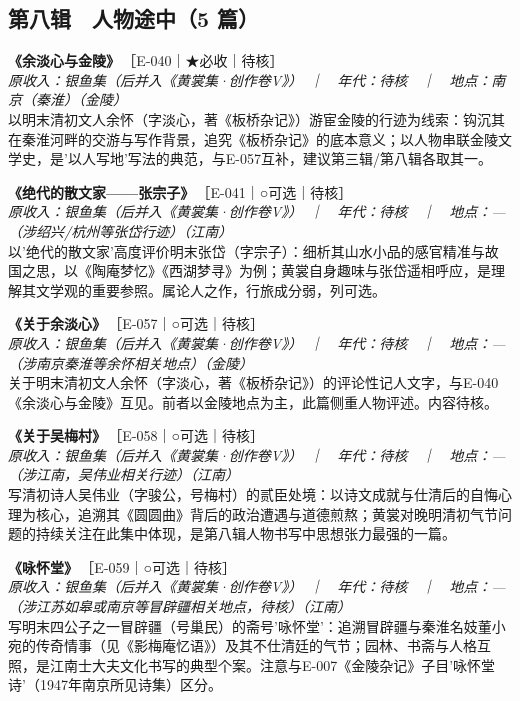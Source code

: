 \documentclass[UTF8,fontset=none,zihao=-4,a4paper]{ctexart}
\begin{document}
\subsection{第八辑　人物途中（5 篇）}
\noindent\textbf{《余淡心与金陵》}\,{\small ［E-040｜★必收｜待核］}\\
{\small\itshape 原收入：银鱼集（后并入《黄裳集·创作卷V》）　｜　年代：待核　｜　地点：南京（秦淮）（金陵）}\\
以明末清初文人余怀（字淡心，著《板桥杂记》）游宦金陵的行迹为线索：钩沉其在秦淮河畔的交游与写作背景，追究《板桥杂记》的底本意义；以人物串联金陵文学史，是'以人写地'写法的典范，与E-057互补，建议第三辑/第八辑各取其一。
\par\vspace{5pt}
\noindent\textbf{《绝代的散文家——张宗子》}\,{\small ［E-041｜○可选｜待核］}\\
{\small\itshape 原收入：银鱼集（后并入《黄裳集·创作卷V》）　｜　年代：待核　｜　地点：—（涉绍兴/杭州等张岱行迹）（江南）}\\
以'绝代的散文家'高度评价明末张岱（字宗子）：细析其山水小品的感官精准与故国之思，以《陶庵梦忆》《西湖梦寻》为例；黄裳自身趣味与张岱遥相呼应，是理解其文学观的重要参照。属论人之作，行旅成分弱，列可选。
\par\vspace{5pt}
\noindent\textbf{《关于余淡心》}\,{\small ［E-057｜○可选｜待核］}\\
{\small\itshape 原收入：银鱼集（后并入《黄裳集·创作卷V》）　｜　年代：待核　｜　地点：—（涉南京秦淮等余怀相关地点）（金陵）}\\
关于明末清初文人余怀（字淡心，著《板桥杂记》）的评论性记人文字，与E-040《余淡心与金陵》互见。前者以金陵地点为主，此篇侧重人物评述。内容待核。
\par\vspace{5pt}
\noindent\textbf{《关于吴梅村》}\,{\small ［E-058｜○可选｜待核］}\\
{\small\itshape 原收入：银鱼集（后并入《黄裳集·创作卷V》）　｜　年代：待核　｜　地点：—（涉江南，吴伟业相关行迹）（江南）}\\
写清初诗人吴伟业（字骏公，号梅村）的贰臣处境：以诗文成就与仕清后的自悔心理为核心，追溯其《圆圆曲》背后的政治遭遇与道德煎熬；黄裳对晚明清初气节问题的持续关注在此集中体现，是第八辑人物书写中思想张力最强的一篇。
\par\vspace{5pt}
\noindent\textbf{《咏怀堂》}\,{\small ［E-059｜○可选｜待核］}\\
{\small\itshape 原收入：银鱼集（后并入《黄裳集·创作卷V》）　｜　年代：待核　｜　地点：—（涉江苏如皋或南京等冒辟疆相关地点，待核）（江南）}\\
写明末四公子之一冒辟疆（号巢民）的斋号'咏怀堂'：追溯冒辟疆与秦淮名妓董小宛的传奇情事（见《影梅庵忆语》）及其不仕清廷的气节；园林、书斋与人格互照，是江南士大夫文化书写的典型个案。注意与E-007《金陵杂记》子目'咏怀堂诗'（1947年南京所见诗集）区分。
\par\vspace{5pt}
\end{document}
